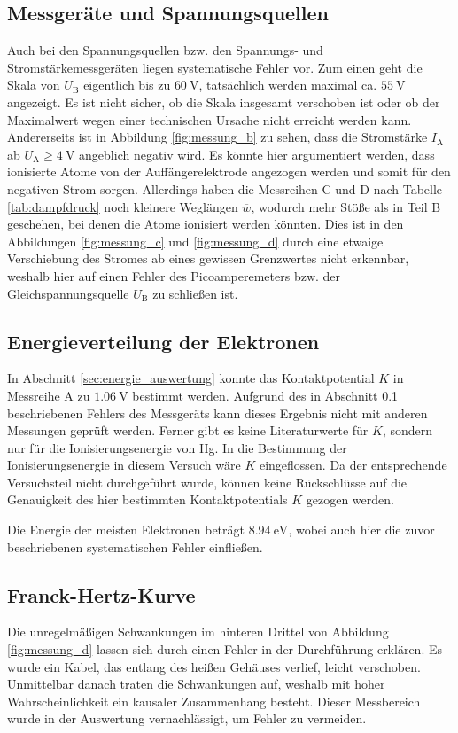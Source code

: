 \subsection{Messgeräte und Spannungsquellen}
\label{sec:geraete}
Auch bei den Spannungsquellen bzw. den Spannungs- und Stromstärkemessgeräten liegen systematische Fehler vor.
Zum einen geht die Skala von $U_\text{B}$ eigentlich bis zu $\qty[]{60}{\volt}$, tatsächlich werden maximal ca. $\qty[]{55}{\volt}$ angezeigt.
Es ist nicht sicher, ob die Skala insgesamt verschoben ist oder ob der Maximalwert wegen einer technischen Ursache nicht erreicht werden kann.
Andererseits ist in Abbildung \ref{fig:messung_b} zu sehen, dass die Stromstärke $I_\text{A}$ ab $U_\text{A} \geq \qty[]{4}{\volt}$ angeblich negativ wird.
Es könnte hier argumentiert werden, dass ionisierte Atome von der Auffängerelektrode angezogen werden und somit für den negativen Strom sorgen.
Allerdings haben die Messreihen C und D nach Tabelle \ref{tab:dampfdruck} noch kleinere Weglängen $\overline{w}$, wodurch mehr Stöße als in Teil B geschehen,
bei denen die Atome ionisiert werden könnten.
Dies ist in den Abbildungen \ref{fig:messung_c} und \ref{fig:messung_d} durch eine etwaige Verschiebung des Stromes ab eines gewissen Grenzwertes nicht erkennbar, 
weshalb hier auf einen Fehler des Picoamperemeters bzw. der Gleichspannungsquelle $U_\text{B}$ zu schließen ist. 



\subsection{Energieverteilung der Elektronen}
In Abschnitt \ref{sec:energie_auswertung} konnte das Kontaktpotential $K$ in Messreihe A zu $\qty{1.06}{\volt}$ bestimmt werden.
Aufgrund des in Abschnitt \ref{sec:geraete} beschriebenen Fehlers des Messgeräts kann dieses Ergebnis nicht mit anderen Messungen geprüft werden.
Ferner gibt es keine Literaturwerte für $K$, sondern nur für die Ionisierungsenergie von Hg.
In die Bestimmung der Ionisierungsenergie in diesem Versuch wäre $K$ eingeflossen.
Da der entsprechende Versuchsteil nicht durchgeführt wurde, können keine Rückschlüsse auf die Genauigkeit des hier bestimmten Kontaktpotentials $K$ gezogen werden.

\noindent
Die Energie der meisten Elektronen beträgt $\qty[]{8.94}{\electronvolt}$, wobei auch hier die zuvor beschriebenen systematischen Fehler einfließen.


\subsection{Franck-Hertz-Kurve}
Die unregelmäßigen Schwankungen im hinteren Drittel von Abbildung \ref{fig:messung_d} lassen sich durch einen Fehler in der Durchführung erklären.
Es wurde ein Kabel, das entlang des heißen Gehäuses verlief, leicht verschoben. 
Unmittelbar danach traten die Schwankungen auf, weshalb mit hoher Wahrscheinlichkeit ein kausaler Zusammenhang besteht.
Dieser Messbereich wurde in der Auswertung vernachlässigt, um Fehler zu vermeiden.

